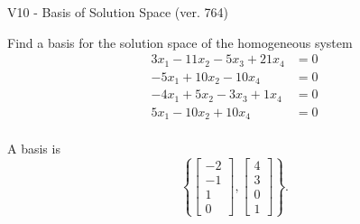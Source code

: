 \begin{exercise}
  \begin{exerciseTitle}V10 - Basis of Solution Space (ver. 764)\end{exerciseTitle}
  \begin{exerciseStatement}
    Find a basis for the solution space of the homogeneous system 
\begin{align*}
 3 x_ 1 -11 x_ 2 -5 x_ 3 + 21 x_ 4 &= 0  \\ 
  -5 x_ 1 + 10 x_ 2 -10 x_ 4 &= 0  \\ 
  -4 x_ 1 + 5 x_ 2 -3 x_ 3 + 1 x_ 4 &= 0  \\ 
  5 x_ 1 -10 x_ 2 + 10 x_ 4 &= 0  \\ 
 \end{align*}


 
  \end{exerciseStatement}

  \begin{exerciseAnswer}
   A basis is   
\[\left\{\left[\begin{array}{c}
-2 \\
-1 \\
1 \\
0
\end{array}\right] , \left[\begin{array}{c}
4 \\
3 \\
0 \\
1
\end{array}\right]\right\}.\]

  


  \end{exerciseAnswer}
\end{exercise}